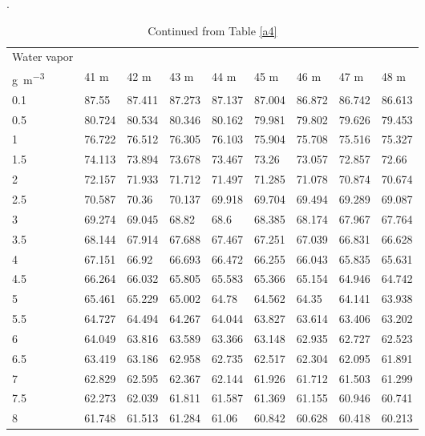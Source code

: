 \begin{bibunit}
\begin{table}[]
	\centering
	\scriptsize
	\caption{Continued from Table \ref{a4}}.
	\label{a5}
	\begin{tabular}{lllllllll}
		\toprule
				Water vapor &&&&&&&&\\
					    		\si{\gram\per\meter\cubed}	 & 41 \si{\meter}     & 42 \si{\meter}     & 43 \si{\meter}     & 44 \si{\meter}     & 45 \si{\meter}     & 46 \si{\meter}     & 47 \si{\meter}     & 48 \si{\meter}     \\
					    				\midrule
					0.1  & 87.55  & 87.411 & 87.273 & 87.137 & 87.004 & 86.872 & 86.742 & 86.613 \\
					0.5  & 80.724 & 80.534 & 80.346 & 80.162 & 79.981 & 79.802 & 79.626 & 79.453 \\
					1    & 76.722 & 76.512 & 76.305 & 76.103 & 75.904 & 75.708 & 75.516 & 75.327 \\
					1.5  & 74.113 & 73.894 & 73.678 & 73.467 & 73.26  & 73.057 & 72.857 & 72.66  \\
					2    & 72.157 & 71.933 & 71.712 & 71.497 & 71.285 & 71.078 & 70.874 & 70.674 \\
					2.5  & 70.587 & 70.36  & 70.137 & 69.918 & 69.704 & 69.494 & 69.289 & 69.087 \\
					3    & 69.274 & 69.045 & 68.82  & 68.6   & 68.385 & 68.174 & 67.967 & 67.764 \\
					3.5  & 68.144 & 67.914 & 67.688 & 67.467 & 67.251 & 67.039 & 66.831 & 66.628 \\
					4    & 67.151 & 66.92  & 66.693 & 66.472 & 66.255 & 66.043 & 65.835 & 65.631 \\
					4.5  & 66.264 & 66.032 & 65.805 & 65.583 & 65.366 & 65.154 & 64.946 & 64.742 \\
					5    & 65.461 & 65.229 & 65.002 & 64.78  & 64.562 & 64.35  & 64.141 & 63.938 \\
					5.5  & 64.727 & 64.494 & 64.267 & 64.044 & 63.827 & 63.614 & 63.406 & 63.202 \\
					6    & 64.049 & 63.816 & 63.589 & 63.366 & 63.148 & 62.935 & 62.727 & 62.523 \\
					6.5  & 63.419 & 63.186 & 62.958 & 62.735 & 62.517 & 62.304 & 62.095 & 61.891 \\
					7    & 62.829 & 62.595 & 62.367 & 62.144 & 61.926 & 61.712 & 61.503 & 61.299 \\
					7.5  & 62.273 & 62.039 & 61.811 & 61.587 & 61.369 & 61.155 & 60.946 & 60.741 \\
					8    & 61.748 & 61.513 & 61.284 & 61.06  & 60.842 & 60.628 & 60.418 & 60.213 \\

\end{tabular}
\end{table}
\end{bibunit}
